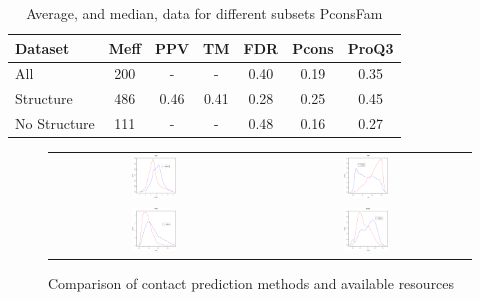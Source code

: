 \documentclass[a4,center,fleqn]{NAR}
\begin{document}
\begin{table}
\begin{tabular}{lcccccc}
Dataset & Meff & PPV & TM & FDR & Pcons & ProQ3\\   
\hline  
All  &  200 & - & - & 0.40 & 0.19 & 0.35\\
Structure &  486 &  0.46 & 0.41 & 0.28 & 0.25 & 0.45\\ 
No Structure & 111 & - & - & 0.48 & 0.16 & 0.27 \\
\end{tabular}
\caption{Average, and median, data for different subsets PconsFam}
\label{tab:summary}
\end{table}




\begin{figure}[t]
\begin{center}
\begin{tabular}{cc}
    \includegraphics[width=0.22\textwidth]{figures/density_meff.eps}&
    \includegraphics[width=0.22\textwidth]{figures/density_fdr.eps}\\
    \includegraphics[width=0.22\textwidth]{figures/density_pcons.eps}&
    \includegraphics[width=0.22\textwidth]{figures/density_proq.eps}\\
\end{tabular}
\end{center}
\caption{Comparison of contact prediction methods and available resources}
\label{fig:overview}
\end{figure}
\end{document}
